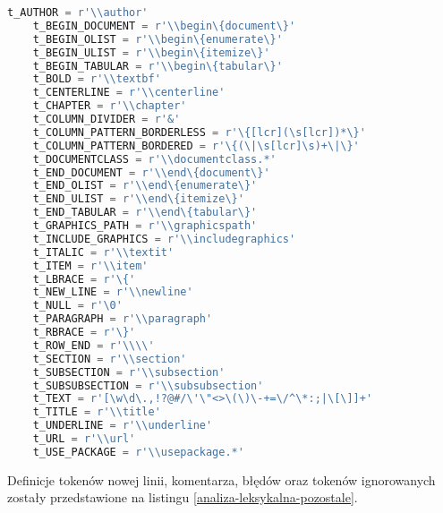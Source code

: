 \begin{lstlisting}[language={Python}, caption={Analiza leksykalna - wyrażenia regularne}, label={analiza-leksykalna-wyrazenia}]
    t_AUTHOR = r'\\author'
    t_BEGIN_DOCUMENT = r'\\begin\{document\}'
    t_BEGIN_OLIST = r'\\begin\{enumerate\}'
    t_BEGIN_ULIST = r'\\begin\{itemize\}'
    t_BEGIN_TABULAR = r'\\begin\{tabular\}'
    t_BOLD = r'\\textbf'
    t_CENTERLINE = r'\\centerline'
    t_CHAPTER = r'\\chapter'
    t_COLUMN_DIVIDER = r'&'
    t_COLUMN_PATTERN_BORDERLESS = r'\{[lcr](\s[lcr])*\}'
    t_COLUMN_PATTERN_BORDERED = r'\{(\|\s[lcr]\s)+\|\}'
    t_DOCUMENTCLASS = r'\\documentclass.*'
    t_END_DOCUMENT = r'\\end\{document\}'
    t_END_OLIST = r'\\end\{enumerate\}'
    t_END_ULIST = r'\\end\{itemize\}'
    t_END_TABULAR = r'\\end\{tabular\}'
    t_GRAPHICS_PATH = r'\\graphicspath'
    t_INCLUDE_GRAPHICS = r'\\includegraphics'
    t_ITALIC = r'\\textit'
    t_ITEM = r'\\item'
    t_LBRACE = r'\{'
    t_NEW_LINE = r'\\newline'
    t_NULL = r'\0'
    t_PARAGRAPH = r'\\paragraph'
    t_RBRACE = r'\}'
    t_ROW_END = r'\\\\'
    t_SECTION = r'\\section'
    t_SUBSECTION = r'\\subsection'
    t_SUBSUBSECTION = r'\\subsubsection'
    t_TEXT = r'[\w\d\.,!?@#/\'\"<>\(\)\-+=\/^\*:;|\[\]]+'
    t_TITLE = r'\\title'
    t_UNDERLINE = r'\\underline'
    t_URL = r'\\url'
    t_USE_PACKAGE = r'\\usepackage.*'
\end{lstlisting}

Definicje tokenów nowej linii, komentarza, błędów oraz tokenów ignorowanych zostały przedstawione na listingu \ref{analiza-leksykalna-pozostale}.

